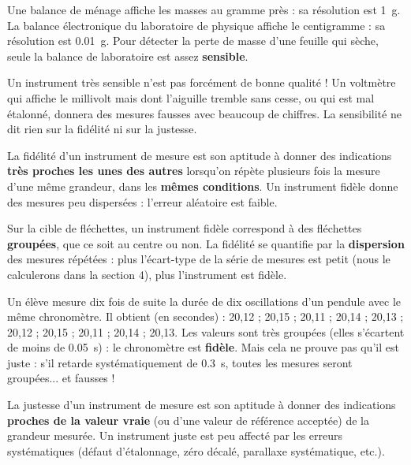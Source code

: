 \documentclass[11pt]{article}
\newcommand{\cle}[1]{{\popxbold\color{popdark}#1}}
\newcounter{popsec}
\newcounter{popsub}
\newcommand{\courssub}[1]{%
  \stepcounter{popsub}%
  \par\vspace{9pt}\noindent{\popxbold\fontsize{11.5}{13}\selectfont\color{popink}{\color{poporange}\thepopsec.\thepopsub}\hspace{6pt}#1}\par\nopagebreak\vspace{4pt}
}
\begin{document}
\begin{exemplebox}
Une balance de ménage affiche les masses au gramme près : sa résolution est \SI{1}{g}. La balance électronique du laboratoire de physique affiche le centigramme : sa résolution est \SI{0,01}{g}. Pour détecter la perte de masse d'une feuille qui sèche, seule la balance de laboratoire est assez \textbf{sensible}.
\end{exemplebox}

\begin{attention}
Un instrument très sensible n'est pas forcément de bonne qualité ! Un voltmètre qui affiche le millivolt mais dont l'aiguille tremble sans cesse, ou qui est mal étalonné, donnera des mesures fausses avec beaucoup de chiffres. La sensibilité ne dit rien sur la fidélité ni sur la justesse.
\end{attention}

\courssub{La fidélité}

\begin{definition}[Fidélité]
La \cle{fidélité} d'un instrument de mesure est son aptitude à donner des indications \textbf{très proches les unes des autres} lorsqu'on répète plusieurs fois la mesure d'une même grandeur, dans les \textbf{mêmes conditions}. Un instrument fidèle donne des mesures peu dispersées : l'\cle{erreur aléatoire} est faible.
\end{definition}

Sur la cible de fléchettes, un instrument fidèle correspond à des fléchettes \textbf{groupées}, que ce soit au centre ou non. La fidélité se quantifie par la \textbf{dispersion} des mesures répétées : plus l'écart-type de la série de mesures est petit (nous le calculerons dans la section 4), plus l'instrument est fidèle.

\begin{exemplebox}
Un élève mesure dix fois de suite la durée de dix oscillations d'un pendule avec le même chronomètre. Il obtient (en secondes) : 20,12 ; 20,15 ; 20,11 ; 20,14 ; 20,13 ; 20,12 ; 20,15 ; 20,11 ; 20,14 ; 20,13. Les valeurs sont très groupées (elles s'écartent de moins de \SI{0,05}{s}) : le chronomètre est \textbf{fidèle}. Mais cela ne prouve pas qu'il est juste : s'il retarde systématiquement de \SI{0,3}{s}, toutes les mesures seront groupées... et fausses !
\end{exemplebox}

\courssub{La justesse}

\begin{definition}[Justesse]
La \cle{justesse} d'un instrument de mesure est son aptitude à donner des indications \textbf{proches de la valeur vraie} (ou d'une valeur de référence acceptée) de la grandeur mesurée. Un instrument juste est peu affecté par les \cle{erreurs systématiques} (défaut d'étalonnage, zéro décalé, parallaxe systématique, etc.).
\end{definition}
\end{document}
